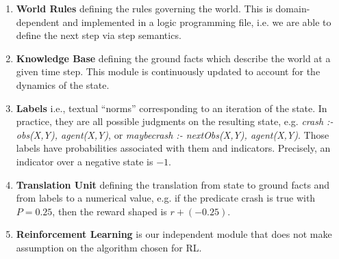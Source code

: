 \begin{multicols}{2}
\begin{enumerate}
  
  \item \textbf{World Rules} defining the rules governing the world. This is domain-dependent and implemented 
        in a logic programming file, i.e. we are able to define the next step via step semantics.
  
  \item \textbf{Knowledge Base} defining the ground facts which describe the world at a given time step. This module is 
        continuously updated to account for the dynamics of the
        state.

  \item \textbf{Labels} i.e., textual ``norms'' corresponding to an
  iteration of the state. In practice, they are all possible judgments
  on the resulting state, e.g. \textit{crash :- obs(X,Y), agent(X,Y)},
  or \textit{maybecrash :- nextObs(X,Y), agent(X,Y)}.  Those labels
  have probabilities associated with them and indicators. Precisely,
  an indicator over a negative state is $-1$. 

  \item \textbf{Translation Unit} defining the translation from state
  to ground facts and from labels to a numerical value, e.g. if the
  predicate crash is true with $P = 0.25$, then the reward shaped is
  $r + (-0.25)$.

  \item \textbf{Reinforcement Learning} is our independent module that
  does not make assumption on the algorithm chosen for RL.
\end{enumerate}
\end{multicols}


